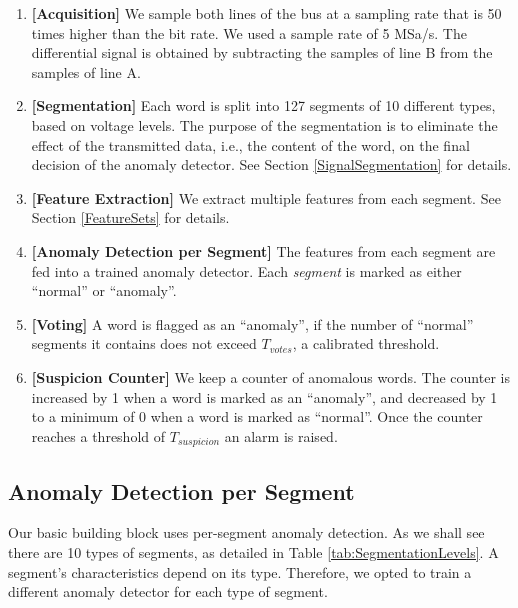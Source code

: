 \documentclass[english]{llncs}
\newcommand{\sublevel}[1]{\subsection{#1}}
\newcommand{\sublevel}[1]{\section{#1}}
\begin{document}
  \begin{enumerate}
  \vspace*{-1ex} %
    \item \textbf{[Acquisition]}
          We sample both lines of the bus at a sampling rate that is 50 times higher than the bit rate. We used a sample rate of 5 MSa/s. The differential signal is obtained by subtracting the samples of line B from the samples of line A.
    \item \textbf{[Segmentation]}
          Each word is split into 127 segments of 10 different types, based on voltage levels. The purpose of the segmentation is to eliminate the effect of the transmitted data, i.e., the content of the word, on the final decision of the anomaly detector. See Section \ref{SignalSegmentation} for details.
    \item \textbf{[Feature Extraction]}
          We extract multiple features from each segment. See Section \ref{FeatureSets} for details.
    \item \textbf{[Anomaly Detection per Segment]}
          The features from each segment are fed into a trained anomaly detector. Each \textit{segment} is marked as either ``normal'' or ``anomaly''.
    \item \textbf{[Voting]}
          A word is flagged as an ``anomaly'', if the number of ``normal'' segments it contains does not exceed $T_{votes}$, a calibrated threshold.
    \item \textbf{[Suspicion Counter]}
          We keep a counter of anomalous words. The counter is increased by 1 when a word is marked as an ``anomaly'', and decreased by 1  to a minimum of 0 when a word is marked as ``normal''. Once the counter reaches a threshold of $T_{suspicion}$ an alarm is raised.
  \end{enumerate}

  
\sublevel{Anomaly Detection per Segment}
  Our basic building block uses per-segment anomaly detection. As we shall see there are 10 types of segments, as detailed in Table \ref{tab:SegmentationLevels}. A segment's characteristics depend on its type. Therefore, we opted to train a different anomaly detector for each type of segment.
  
\end{document}
